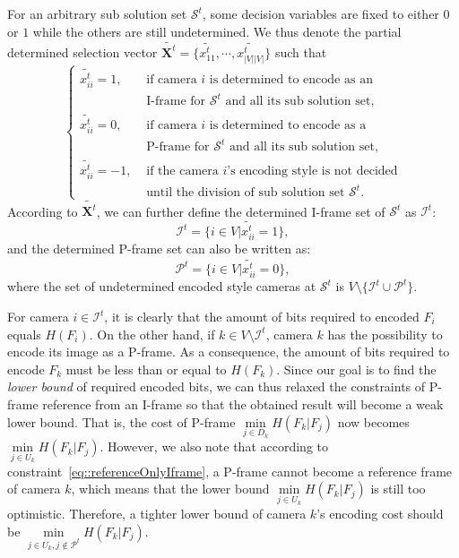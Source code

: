 For an arbitrary sub solution set $\mathcal{S}^t$, some decision variables are fixed to either $0$ or $1$ while the others are still undetermined.
We thus denote the partial determined selection vector ${\tilde{\mathbf{X}^t} = \{ \tilde{x_{11}^t},\cdots, \tilde{x_{|V||V|}^t} \} }$ such that
\begin{equation*}
\left\{ \begin{array}{ll}
\tilde{x_{ii}^t} = 1,  &\text{ if camera $i$ is determined to encode as an} \\
                   	   &\text{ I-frame for $\mathcal{S}^t$ and all its sub solution set,} \\
\tilde{x_{ii}^t} = 0,  &\text{ if camera $i$ is determined to encode as a} \\
                   	   &\text{ P-frame for $\mathcal{S}^t$ and all its sub solution set,} \\
\tilde{x_{ii}^t} = -1, &\text{ if the camera $i$'s encoding style is not decided} \\
                       &\text{ until the division of sub solution set $\mathcal{S}^t$.}
\end{array} \right.
\end{equation*}
%
According to $\tilde{\mathbf{X}^t}$, we can further define the determined I-frame set of $\mathcal{S}^t$ as $\mathcal{I}^t$:
\begin{equation}
\mathcal{I}^t = \{ i \in V | \tilde{x_{ii}^t} = 1 \},
\label{eq::IframeSet}
\end{equation}
and the determined P-frame set can also be written as:
\begin{equation}
\mathcal{P}^t = \{ i \in V | \tilde{x_{ii}^t} = 0 \},
\label{eq::PframeSet}
\end{equation}
where the set of undetermined encoded style cameras at $\mathcal{S}^t$ is $V \setminus \{ \mathcal{I}^t \cup \mathcal{P}^t \}$.

For camera $i \in \mathcal{I}^t$, it is clearly that the amount of bits required to encoded $F_i$ equals $H(F_i)$.
On the other hand, if $k \in V \setminus \mathcal{I}^t$, camera $k$ has the possibility to encode its image as a P-frame.
As a consequence, the amount of bits required to encode $F_k$ must be less than or equal to $H(F_k)$.
Since our goal is to find the \emph{lower bound} of required encoded bits, we can thus relaxed the constraints of P-frame reference from an I-frame so that the obtained result will become a weak lower bound.
That is, the cost of P-frame $\underset{j \in D_k}{\min} H(F_k|F_j)$ now becomes $\underset{j \in U_k}{\min} H(F_k|F_j)$.
However, we also note that according to constraint~\eqref{eq::referenceOnlyIframe}, a P-frame cannot become a reference frame of camera $k$, which means that the lower bound $\underset{j \in U_k}{\min} H(F_k|F_j)$ is still too optimistic.
Therefore, a tighter lower bound of camera $k$'s encoding cost should be $\underset{j \in U_k, j \notin \mathcal{P}^t}{\min} H(F_k|F_j)$.
%

